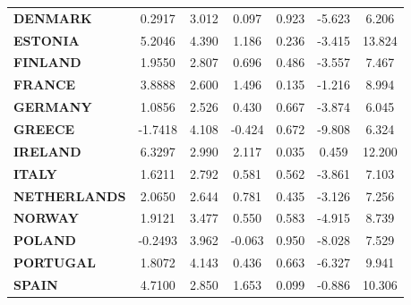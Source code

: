 \documentclass[ 11pt]{article}
\begin{document}
\begin{center}
\begin{tabular}{lcccccc}
\textbf{DENMARK}                                       &       0.2917  &        3.012     &     0.097  &         0.923        &       -5.623    &        6.206     \\
\textbf{ESTONIA}                                       &       5.2046  &        4.390     &     1.186  &         0.236        &       -3.415    &       13.824     \\
\textbf{FINLAND}                                       &       1.9550  &        2.807     &     0.696  &         0.486        &       -3.557    &        7.467     \\
\textbf{FRANCE}                                        &       3.8888  &        2.600     &     1.496  &         0.135        &       -1.216    &        8.994     \\
\textbf{GERMANY}                                       &       1.0856  &        2.526     &     0.430  &         0.667        &       -3.874    &        6.045     \\
\textbf{GREECE}                                        &      -1.7418  &        4.108     &    -0.424  &         0.672        &       -9.808    &        6.324     \\
\textbf{IRELAND}                                       &       6.3297  &        2.990     &     2.117  &         0.035        &        0.459    &       12.200     \\
\textbf{ITALY}                                         &       1.6211  &        2.792     &     0.581  &         0.562        &       -3.861    &        7.103     \\
\textbf{NETHERLANDS}                                   &       2.0650  &        2.644     &     0.781  &         0.435        &       -3.126    &        7.256     \\
\textbf{NORWAY}                                        &       1.9121  &        3.477     &     0.550  &         0.583        &       -4.915    &        8.739     \\
\textbf{POLAND}                                        &      -0.2493  &        3.962     &    -0.063  &         0.950        &       -8.028    &        7.529     \\
\textbf{PORTUGAL}                                      &       1.8072  &        4.143     &     0.436  &         0.663        &       -6.327    &        9.941     \\
\textbf{SPAIN}                                         &       4.7100  &        2.850     &     1.653  &         0.099        &       -0.886    &       10.306     \\

\end{tabular}
\end{center}
\end{document}
